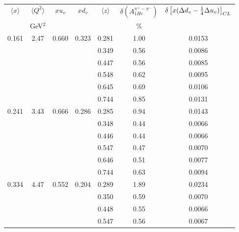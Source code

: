 \begin{table}[htbp]
\begin{center}
\begin{tabular}{|ccccc||c|c|}
\hline
$\langle x \rangle $   & $ \langle Q^2 \rangle $   & $x  u_v$ & $x d_v$ & $\langle z \rangle$ & $\delta \left(A_{1He}^{\pi^+ - \pi^-} \right)$  &
$\delta \left[ x( \Delta d_v -{1 \over 4} \Delta u_v ) \right]_{CL}$  \\
                       & GeV$^2$              &          &    &       &  $\%$    &                                                              \\ \hline \hline
   0.161 &    2.47 &   0.660 &    0.323 &    0.281 &      1.00 &    0.0153 \\
         &          &          &          &    0.349 &      0.56 &    0.0086 \\
         &          &          &          &    0.447 &      0.56 &    0.0085 \\
         &          &          &          &    0.548 &      0.62 &    0.0095 \\
         &          &          &          &    0.645 &      0.69 &    0.0106 \\
         &          &          &          &    0.744 &      0.85 &    0.0131 \\
   0.241 &    3.43 &   0.666 &    0.286 &    0.285 &      0.94 &    0.0143 \\
         &          &          &          &    0.348 &      0.44 &    0.0066 \\
         &          &          &          &    0.446 &      0.44 &    0.0066 \\
         &          &          &          &    0.547 &      0.47 &    0.0070 \\
         &          &          &          &    0.646 &      0.51 &    0.0077 \\
         &          &          &          &    0.744 &      0.63 &    0.0094 \\
   0.334 &    4.47 &   0.552 &    0.204 &    0.289 &      1.89 &    0.0234 \\
         &          &          &          &    0.350 &      0.59 &    0.0070 \\
         &          &          &          &    0.448 &      0.55 &    0.0066 \\
         &          &          &          &    0.547 &      0.56 &    0.0067 \\

\end{tabular}
\end{center}
\end{table}

